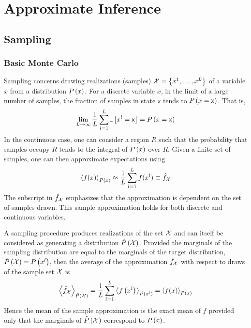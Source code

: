 
\graphicspath{{Chapter12/Figs/}}

\chapter{Approximate Inference}
\label{chapter12}



\section{Sampling}
\label{section12.1}

\subsection{Basic Monte Carlo}

Sampling concerns drawing realizations (samples) $\cX=\left\{x^1,\dotsc,x^L\right\}$ of a variable $x$ from a distribution $\P{x}$. For a discrete variable $x$, in the limit of a large number of samples, the fraction of samples in state $\mathsf{x}$ tends to $\P{x=\mathsf{x}}$. That is,
\begin{align*}
\lim_{L\to\infty}\frac{1}{L}\sum_{l=1}^L\bI\left[x^l=\mathsf{x}\right]=\P{x=\mathsf{x}}
\end{align*}
In the continuous case, one can consider a region $R$ such that the probability that samples occupy $R$ tends to the integral of $\P{x}$ over $R$. Given a finite set of samples, one can then approximate expectations using
\begin{align*}
\vecx{f(x)}_{\P{x}}\approx\frac{1}{L}\sum_{l=1}^Lf(x^l)\equiv\hat{f}_\cX
\end{align*}
The subscript in $\hat{f}_\cX$ emphasizes that the approximation is dependent on the set of samples drawn. This sample approximation holds for both discrete and continuous variables.

A sampling procedure produces realizations of the set $\cX$ and can itself be considered as generating a distribution $\ti{P}\left(\cX\right)$. Provided the marginals of the sampling distribution are equal to the marginals of the target distribution, $\ti{P}\left(\cX\right)=\P{x^l}$, then the average of the approximation $\hat{f}_\cX$ with respect to draws of the sample set $\cX$ is
\begin{align*}
\vecx{\hat{f}_\cX}_{\ti{P}\left(\cX\right)}=\frac{1}{L}\sum_{l=1}^L\vecx{f\left(x^l\right)}_{\ti{P}\left(x^l\right)}=\vecx{f(x)}_{\P{x}}
\end{align*}
Hence the mean of the sample approximation is the exact mean of $f$ provided only that the marginals of $\ti{P}\left(\cX\right)$ correspond to $\P{x}$.

